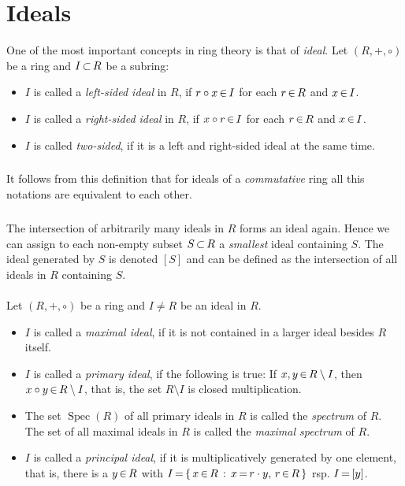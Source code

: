\documentclass[11pt,twoside]{article}
\begin{document}
\section{Ideals}
One of the most important concepts in ring theory is that of \textit{ideal}.
Let $(R,+,\circ)$ be a ring and $I {\,\subset\,} R$ be a subring:

\begin{itemize}[leftmargin=15pt]
\item[1.]
$I$ is called a \textit{left-sided ideal} in $R$,
if $r \circ x {\,\in\,} I$
for each $r {\,\in\,} R$ and $x {\,\in\,} I$.
\item[2.]
$I$ is called a \textit{right-sided ideal} in $R$,
if $x \circ r {\,\in\,} I$ for each $r {\,\in\,} R$ and $x {\,\in\,} I$.
\item[3.]
$I$ is called \textit{two-sided},
if it is a left and right-sided ideal at the same time.
\end{itemize}

\subparagraph{}
It follows from this definition
that for ideals of a \textit{commutative} ring all this notations
are equivalent to each other.

\subparagraph{}
The intersection of arbitrarily many ideals in $R$ forms an ideal again.
Hence we can assign to each non-empty subset $S {\,\subset\,} R$
a \textit{smallest} ideal containing $S$.
The ideal generated by $S$ is denoted $[S]$ and can be defined
as the intersection of all ideals in $R$ containing $S$.

\paragraph{}
Let $(R,+,\circ)$ be a ring and $I \neq R$ be an ideal in $R$.

\begin{itemize}[leftmargin=15pt]
\item[1.]
$I$ is called a \textit{maximal ideal}, 
if it is not contained in a larger ideal besides $R$ itself.

\item[2.]
$I$ is called a \textit{primary ideal}, if the following is true:
If $x,y {\,\in\,} R \setminus I$, then $x \circ y {\,\in\,} R \setminus I$,
that is,
the set $R \setminus I$ is closed {\wrt} multiplication.

\item[3.]
The set $\operatorname{Spec}(R)$ of all primary ideals in $R$
is called the \textit{spectrum} of $R$.
The set of all maximal ideals in $R$ is called the \textit{maximal spectrum} of $R$.

\item[4.]
$I$ is called a \textit{principal ideal},
if it is multiplicatively generated by one element,
that is,
there is a $y {\,\in\,} R$ with
$I {\,=\,} \{ \, x {\,\in\,} R \,: \, x {\,=\,} r \cdot y, \, r {\,\in\,} R \, \}$ rsp. $I {\,=\,} [y]$.
\end{itemize}
\end{document}
